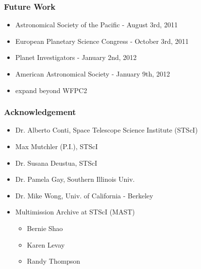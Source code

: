 \documentclass{beamer}
\begin{document}
\begin{frame}
  \frametitle{Future Work}
  \begin{itemize}
    \item Astronomical Society of the Pacific - August 3rd, 2011
    \bigskip
    \item European Planetary Science Congress - October 3rd, 2011
    \bigskip
    \item Planet Investigators - January 2nd, 2012
    \bigskip
    \item American Astronomical Society - January 9th, 2012
    \bigskip
    \item expand beyond WFPC2
  \end{itemize}
\end{frame}

\begin{frame}
  \frametitle{Acknowledgement}
  \begin{itemize}
    \item Dr. Alberto Conti, Space Telescope Science Institute (STScI)
    \item Max Mutchler (P.I.), STScI
    \item Dr. Susana Deustua, STScI
    \item Dr. Pamela Gay, Southern Illinois Univ.
    \item Dr. Mike Wong, Univ. of California - Berkeley
    \item Multimission Archive at STScI (MAST)
    \begin{itemize}
      \item Bernie Shao
      \item Karen Levay
      \item Randy Thompson
    \end{itemize}
  \end{itemize}
\end{frame}
\end{document}
